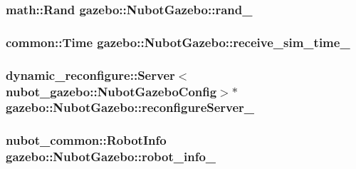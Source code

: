 \hypertarget{classgazebo_1_1NubotGazebo_a5a6b999a205a45e1778e0f4d75e325e0}{
\subsubsection[{rand\-\_\-}]{\setlength{\rightskip}{0pt plus 5cm}math\-::\-Rand gazebo\-::\-Nubot\-Gazebo\-::rand\-\_\-\hspace{0.3cm}{\ttfamily [private]}}}\label{classgazebo_1_1NubotGazebo_a5a6b999a205a45e1778e0f4d75e325e0}
\hypertarget{classgazebo_1_1NubotGazebo_a36186a24f60f3c88fd6fb12fd85b4fa4}{
\subsubsection[{receive\-\_\-sim\-\_\-time\-\_\-}]{\setlength{\rightskip}{0pt plus 5cm}common\-::\-Time gazebo\-::\-Nubot\-Gazebo\-::receive\-\_\-sim\-\_\-time\-\_\-\hspace{0.3cm}{\ttfamily [private]}}}\label{classgazebo_1_1NubotGazebo_a36186a24f60f3c88fd6fb12fd85b4fa4}
\hypertarget{classgazebo_1_1NubotGazebo_a6f892f9dcb5b46bdd232ffec277dd093}{
\subsubsection[{reconfigure\-Server\-\_\-}]{\setlength{\rightskip}{0pt plus 5cm}dynamic\-\_\-reconfigure\-::\-Server$<$nubot\-\_\-gazebo\-::\-Nubot\-Gazebo\-Config$>$$\ast$ gazebo\-::\-Nubot\-Gazebo\-::reconfigure\-Server\-\_\-\hspace{0.3cm}{\ttfamily [private]}}}\label{classgazebo_1_1NubotGazebo_a6f892f9dcb5b46bdd232ffec277dd093}
\hypertarget{classgazebo_1_1NubotGazebo_a0b6c40da9694bc5645ea4abd0ee6825c}{
\subsubsection[{robot\-\_\-info\-\_\-}]{\setlength{\rightskip}{0pt plus 5cm}nubot\-\_\-common\-::\-Robot\-Info gazebo\-::\-Nubot\-Gazebo\-::robot\-\_\-info\-\_\-\hspace{0.3cm}{\ttfamily [private]}}}\label{classgazebo_1_1NubotGazebo_a0b6c40da9694bc5645ea4abd0ee6825c}

